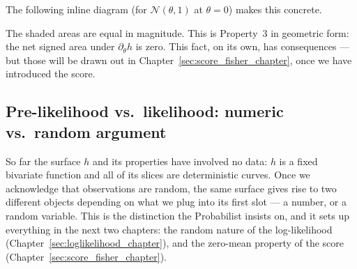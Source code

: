 \documentclass[a4paper,oneside,12pt]{extarticle}
\theoremstyle{plain}
\theoremstyle{definition}
\theoremstyle{remark}
\begin{document}
The following inline diagram (for $\mathcal{N}(\theta,1)$ at $\theta=0$)
makes this concrete.

\begin{center}
\end{center}

The shaded areas are equal in magnitude.  This is Property~3 in
geometric form: the net signed area under $\partial_\theta h$ is zero.
This fact, on its own, has consequences --- but those will be drawn out
in Chapter~\ref{sec:score_fisher_chapter}, once we have introduced the
score.

\subsection{Pre-likelihood vs.\ likelihood: numeric vs.\ random argument}
\label{sec:prelikelihood}

So far the surface $h$ and its properties have involved no data: $h$
is a fixed bivariate function and all of its slices are deterministic
curves.  Once we acknowledge that observations are random, the same
surface gives rise to two different objects depending on what we plug
into its first slot --- a number, or a random variable.  This is the
distinction the Probabilist insists on, and it sets up everything in the next
two chapters: the random nature of the log-likelihood
(Chapter~\ref{sec:loglikelihood_chapter}), and the zero-mean property
of the score (Chapter~\ref{sec:score_fisher_chapter}).
\end{document}
